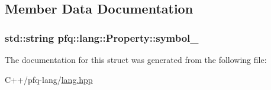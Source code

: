 \subsection{Member Data Documentation}
\hypertarget{structpfq_1_1lang_1_1Property_a9d42c07009ac00fdc93bde1d50a52790}{
\subsubsection[{symbol\+\_\+}]{\setlength{\rightskip}{0pt plus 5cm}std\+::string pfq\+::lang\+::\+Property\+::symbol\+\_\+}}\label{structpfq_1_1lang_1_1Property_a9d42c07009ac00fdc93bde1d50a52790}


The documentation for this struct was generated from the following file\+:\begin{DoxyCompactItemize}
\item 
C++/pfq-\/lang/\hyperlink{lang_8hpp}{lang.\+hpp}\end{DoxyCompactItemize}
